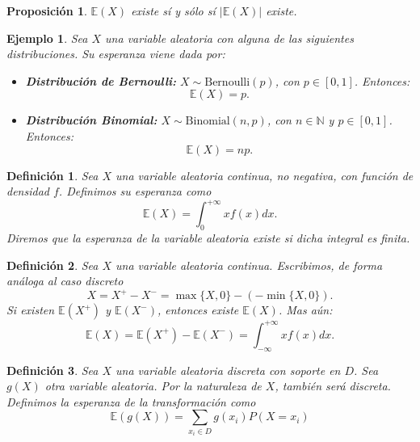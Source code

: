 \documentclass{report}
\newtheorem{prop}{Proposición}[section]
\newtheorem{dfn}{Definición}[section]
\newtheorem{ej}{Ejemplo}[section]
\begin{document}
\begin{prop}
$\mathbb{E}(X)$ existe sí y sólo sí $|\mathbb{E}(X)|$ existe.
\end{prop}

\begin{ej}
Sea \( X \) una variable aleatoria con alguna de las siguientes distribuciones. Su esperanza viene dada por:

\begin{itemize}
    \item \textbf{Distribución de Bernoulli:} \( X \sim \mathrm{Bernoulli}(p) \), con \( p \in [0,1] \). Entonces:
    \[
    \mathbb{E}(X) = p.
    \]

    \item \textbf{Distribución Binomial:} \( X \sim \mathrm{Binomial}(n, p) \), con \( n \in \mathbb{N} \) y \( p \in [0,1] \). Entonces:
    \[
    \mathbb{E}(X) = np.
    \]
\end{itemize}
\end{ej}


\begin{dfn}
    Sea $X$ una variable aleatoria continua, no negativa, con función de densidad $f$. Definimos su esperanza como
    \begin{equation*}
\mathbb{E}(X) = \int_{0}^{+\infty} x f(x) dx.
    \end{equation*}
    Diremos que la esperanza de la variable aleatoria existe si dicha integral es finita.
\end{dfn}

\begin{dfn}
Sea $X$ una variable aleatoria continua. Escribimos, de forma análoga al caso discreto
\begin{equation*}
    X=X^+ - X^- = \max\{X,0\} - (-\min\{X,0\}).
\end{equation*}
Si existen $\mathbb{E}(X^+)$ y $\mathbb{E}(X^-)$, entonces existe $\mathbb{E}(X)$. Mas aún:
\begin{equation*}
    \mathbb{E}(X) = \mathbb{E}(X^+) - \mathbb{E}(X^-) = \int_{-\infty}^{+\infty} x f(x) dx.
\end{equation*}
\end{dfn}

\begin{dfn}
Sea $X$ una variable aleatoria discreta con soporte en $D$. Sea $g(X)$ otra variable aleatoria. Por la naturaleza de $X$, también
será discreta. Definimos la esperanza de la transformación como
\begin{equation*}
\mathbb{E}(g(X)) = \sum_{x_i\in D} g(x_i)P(X=x_i)
\end{equation*}
\end{dfn}
\end{document}
